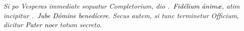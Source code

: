 \documentclass[12pt]{article} %
\newenvironment{rubric}{\color{benred8} \itshape \leftskip 0in \setlength{\parindent}{0.25in}}{\vspace{2 mm}}
\let\oldVbar\Vbar
\renewcommand{\Vbar}{\textcolor{benred8}{\oldVbar .}}
\begin{document}

\gresetfirstlineaboveinitial{\small \textsc{ \textbf{\textcolor{benred8}{\Vbar}}}}{\small \textsc{ \textbf{\textcolor{benred8}{\Vbar}}}}

\vspace{1.5mm}

\begin{rubric}
Si po Vesperas immediate sequatur Completorium, dio \Vbar\ \emph{\textcolor{black}{Fid\'{e}lium \'{a}nim\ae}}, atim incipitur \Vbar\ \emph{\textcolor{black}{Jube D\'{o}mine bened\'{i}cere}}. Secus autem, si tunc terminetur Officium, dicitur \emph{\textcolor{black}{Pater noer}} totum secreto. %

\end{rubric}







\newpage


\end{document}
